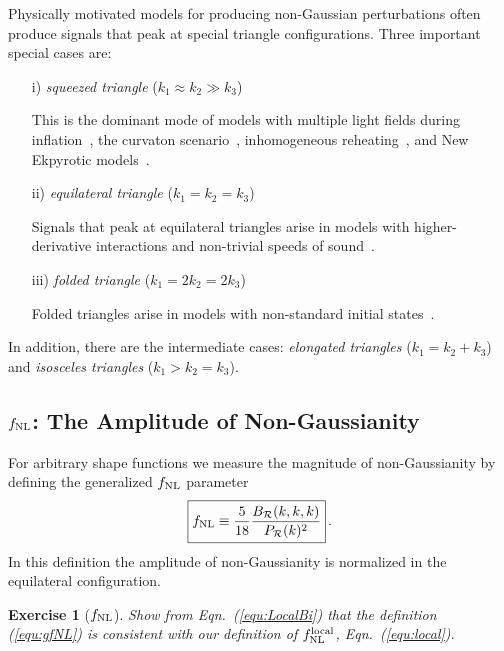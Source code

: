 \documentclass[12pt,letterpaper,rotate]{article}
\def\beq{\begin{equation}}
\def\eeq{\end{equation}}
\def\R{{\cal R}}
\newtheorem{thm}{Exercise}
\begin{document}
{Physically motivated models for producing non-Gaussian perturbations often produce signals that peak at special triangle configurations.
Three important  special cases are:
\begin{enumerate}
\item[i)] {\it squeezed triangle} ($k_1 \approx k_2 \gg k_3$)

This is the dominant mode of models with multiple light fields during inflation~\cite{BMRmulti, Bernardeau:2002jy, Bernardeau:2002jf, Sasaki:2008uc, Naruko:2008sq, Byrnes:2008wi, Byrnes:2006fr, Langlois:2008vk, Valiviita:2008zb, Assadullahi:2007uw, Valiviita:2006mz, Vernizzi:2006ve, Allen:2005ye}, the curvaton scenario~\cite{Linde:1996gt, Lyth_etal03},
inhomogeneous reheating~\cite{Dvali:2003em, Kofman:2003nx}, and New Ekpyrotic
models~\cite{Creminelli:2007aq,Koyama_etal07,Buchbinder_etal07, Lehners:2007wc,Lehners:2008my, Koyama:2007ag, Koyama:2007mg}. 

\item[ii)] {\it equilateral triangle} ($k_1 = k_2 = k_3$) 

Signals that peak at equilateral triangles arise in models with higher-derivative interactions and non-trivial speeds of sound~\cite{DBI, Chen:2006nt}.

\item[iii)] {\it folded triangle} ($k_1 = 2k_2 = 2 k_3$) 

Folded triangles arise in models with non-standard initial states~\cite{Holman:2007na, Chen:2006nt}.
\end{enumerate}

In addition, there are the intermediate cases:
{\it elongated triangles} ($k_1 = k_2 +k_3$) and
{\it isosceles triangles} ($k_1 > k_2 = k_3$).



\subsection{$f_{\rm NL}$: The Amplitude of Non-Gaussianity}

For arbitrary shape functions we measure the magnitude of non-Gaussianity by defining the generalized $f_{\rm NL}$ parameter
\beq
\label{equ:gfNL}
\fbox{$\displaystyle f_{\rm NL} \equiv \frac{5}{18} \frac{B_\R(k,k,k)}{P_\R(k)^2} $}\, .
\eeq
In this definition the amplitude of non-Gaussianity is normalized in the equilateral configuration.

\begin{thm}[$f_{\rm NL}$]
Show from Eqn.~(\ref{equ:LocalBi}) that the definition (\ref{equ:gfNL})  is consistent with our definition of $f_{\rm NL}^{\rm local}$, Eqn.~(\ref{equ:local}).
  \end{thm}


}
\end{document}
